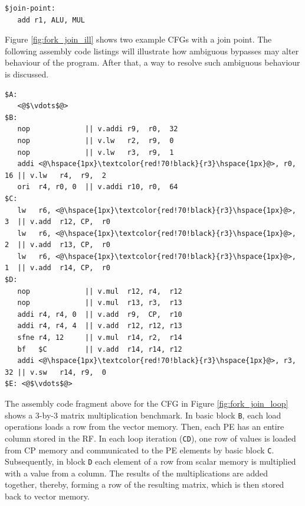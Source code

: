 \begin{lstlisting}
$join-point:
   add r1, ALU, MUL
\end{lstlisting}

Figure \ref{fig:fork_join_ill} shows two example CFGs with a join point. The following assembly code listings will illustrate how ambiguous bypasses may alter behaviour of the program. After that, a way to resolve such ambiguous behaviour is discussed.

\begin{lstlisting}
$A:
   <@$\vdots$@>
$B:
   nop             || v.addi r9,  r0,  32
   nop             || v.lw   r2,  r9,  0
   nop             || v.lw   r3,  r9,  1
   addi <@\hspace{1px}\textcolor{red!70!black}{r3}\hspace{1px}@>, r0, 16 || v.lw   r4,  r9,  2
   ori  r4, r0, 0  || v.addi r10, r0,  64
$C:
   lw   r6, <@\hspace{1px}\textcolor{red!70!black}{r3}\hspace{1px}@>, 3  || v.add  r12, CP,  r0
   lw   r6, <@\hspace{1px}\textcolor{red!70!black}{r3}\hspace{1px}@>, 2  || v.add  r13, CP,  r0
   lw   r6, <@\hspace{1px}\textcolor{red!70!black}{r3}\hspace{1px}@>, 1  || v.add  r14, CP,  r0
$D:
   nop             || v.mul  r12, r4,  r12
   nop             || v.mul  r13, r3,  r13
   addi r4, r4, 0  || v.add  r9,  CP,  r10
   addi r4, r4, 4  || v.add  r12, r12, r13
   sfne r4, 12     || v.mul  r14, r2,  r14
   bf   $C         || v.add  r14, r14, r12
   addi <@\hspace{1px}\textcolor{red!70!black}{r3}\hspace{1px}@>, r3, 32 || v.sw   r14, r9,  0
$E: <@$\vdots$@>
\end{lstlisting}

The assembly code fragment above for the CFG in Figure \ref{fig:fork_join_loop} shows a 3-by-3 matrix multiplication benchmark. In basic block \texttt{B}, each load operations loads a row from the vector memory. Then, each PE has an entire column stored in the RF. In each loop iteration (\texttt{CD}), one row of values is loaded from CP memory and communicated to the PE elements by basic block \texttt{C}. Subsequently, in block \texttt{D} each element of a row from scalar memory is multiplied with a value from a column. The results of the multiplications are added together, thereby, forming a row of the resulting matrix, which is then stored back to vector memory. 

